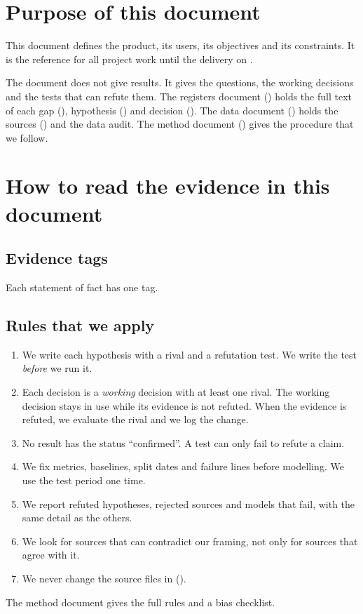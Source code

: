 \documentclass[11pt]{article}
\begin{document}
\makedoctitle
\tableofcontents
\clearpage

\section{Purpose of this document}
This document defines the product, its users, its objectives and its constraints.
It is the reference for all project work until the delivery on \deliverydate.

The document does not give results. It gives the questions, the working decisions and the tests that can refute them.
The registers document () holds the full text of each gap (), hypothesis () and decision ().
The data document () holds the sources () and the data audit.
The method document () gives the procedure that we follow.

\section{How to read the evidence in this document}
\subsection{Evidence tags}
Each statement of fact has one tag.

\taglegend

\subsection{Rules that we apply}
\begin{enumerate}
  \item We write each hypothesis with a rival and a refutation test. We write the test \emph{before} we run it.
  \item Each decision is a \emph{working} decision with at least one rival. The working decision stays in use while its evidence is not refuted. When the evidence is refuted, we evaluate the rival and we log the change.
  \item No result has the status ``confirmed''. A test can only fail to refute a claim.
  \item We fix metrics, baselines, split dates and failure lines before modelling. We use the test period one time.
  \item We report refuted hypotheses, rejected sources and models that fail, with the same detail as the others.
  \item We look for sources that can contradict our framing, not only for sources that agree with it.
  \item We never change the source files in  ().
\end{enumerate}
The method document gives the full rules and a bias checklist.
\end{document}
